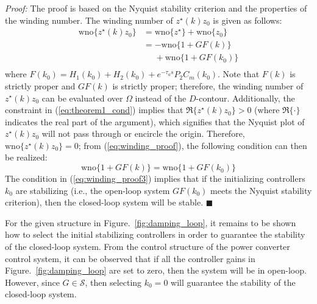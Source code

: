 \documentclass[a4paper, 10pt, conference]{ieeeconf}
\begin{document}
\textit{Proof:}
The proof is based on the Nyquist stability criterion and the properties of the winding number. The winding number of $z^{\star}(k)z_0$ is given as follows:
\begin{equation} \label{eq:winding_proof}
\begin{aligned}
{\mbox{wno}} \{ z^{\star}(k)z_0\} &= {\mbox{wno}} \{ z^{\star}\} + {\mbox{wno}} \{ z_0\} \\
&= -{\mbox{wno}} \{ 1+GF(k)\} \\
&\phantom{=} + {\mbox{wno}} \{ 1+GF(k_0)\} \\
\end{aligned}
\end{equation}
where $F(k_0) = H_1(k_0) + H_2(k_0) + e^{-\tau_{a}s}P_2 C_m(k_0)$. Note that $F(k)$ is strictly proper and $GF(k)$ is strictly proper; therefore, the winding number of $z^{\star}(k)z_0$ can be evaluated over $\Omega$ instead of the $D$-contour. Additionally, the constraint in (\ref{eq:theorem1_cond}) implies that $\Re\{ z^{\star}(k)z_0\} > 0$ (where $\Re\{ \cdot \}$ indicates the real part of the argument), which signifies that the Nyquist plot of $z^{\star}(k)z_0$ will not pass through or encircle the origin. Therefore, $\mbox{wno} \{ z^{\star}(k)z_0\} = 0$; from (\ref{eq:winding_proof}), the following condition can then be realized:
\begin{equation} \label{eq:winding_proof3}
\mbox{wno} \{ 1+GF(k)\} = {\mbox{wno}} \{ 1+GF(k_0)\}
\end{equation}
The condition in (\ref{eq:winding_proof3}) implies that if the initializing controllers $k_0$ are stabilizing (i.e., the open-loop system $GF(k_0)$ meets the Nyquist stability criterion), then the closed-loop system will be stable.
{\hfill \ensuremath{\blacksquare}}

For the given structure in Figure.~\ref{fig:damping_loop}, it remains to be shown how to select the initial stabilizing controllers in order to guarantee the stability of the closed-loop system. From the control structure of the power converter control system, it can be observed that if all the controller gains in Figure.~\ref{fig:damping_loop} are set to zero, then the system will be in open-loop. However, since $G \in \mathscr{S}$, then selecting $k_0 = 0$ will guarantee the stability of the closed-loop system. 
\end{document}
